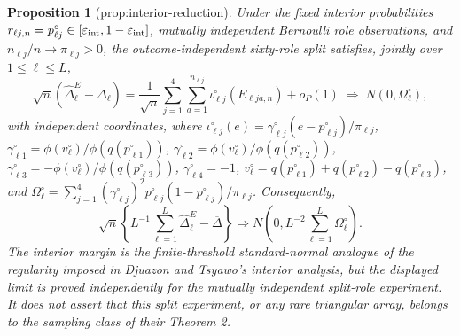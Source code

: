 \documentclass{article}
\newtheorem{proposition}{Proposition}
\begin{document}
\begin{proposition}[prop:interior-reduction]\label{prop:interior-reduction}
Under the fixed interior probabilities \(r_{\ell j,n}=p^{\circ}_{\ell j}\in[\varepsilon_{\rm int},1-\varepsilon_{\rm int}]\), mutually independent Bernoulli role observations, and \(n_{\ell j}/n\to\pi_{\ell j}>0\), the outcome-independent sixty-role split satisfies, jointly over \(1\le\ell\le L\),
\[
\sqrt n(\widehat\Delta^E_{\ell}-\Delta_{\ell})
=\frac1{\sqrt n}\sum_{j=1}^{4}\sum_{a=1}^{n_{\ell j}}
\iota^{\circ}_{\ell j}(E_{\ell j a,n})+o_{P}(1)
\;\Rightarrow\;N(0,\Omega^{\circ}_{\ell}),
\]
with independent coordinates, where \(\iota^{\circ}_{\ell j}(e)=\gamma^{\circ}_{\ell j}(e-p^{\circ}_{\ell j})/\pi_{\ell j}\), \(\gamma^{\circ}_{\ell1}=\phi(v^{\circ}_{\ell})/\phi(q(p^{\circ}_{\ell1}))\), \(\gamma^{\circ}_{\ell2}=\phi(v^{\circ}_{\ell})/\phi(q(p^{\circ}_{\ell2}))\), \(\gamma^{\circ}_{\ell3}=-\phi(v^{\circ}_{\ell})/\phi(q(p^{\circ}_{\ell3}))\), \(\gamma^{\circ}_{\ell4}=-1\), \(v^{\circ}_{\ell}=q(p^{\circ}_{\ell1})+q(p^{\circ}_{\ell2})-q(p^{\circ}_{\ell3})\), and \(\Omega^{\circ}_{\ell}=\sum_{j=1}^{4}(\gamma^{\circ}_{\ell j})^2p^{\circ}_{\ell j}(1-p^{\circ}_{\ell j})/\pi_{\ell j}\). Consequently,
\[
\sqrt n\left\{L^{-1}\sum_{\ell=1}^{L}\widehat\Delta^E_{\ell}-\overline\Delta\right\}
\Rightarrow N\!\left(0,L^{-2}\sum_{\ell=1}^{L}\Omega^{\circ}_{\ell}\right).
\]
The interior margin is the finite-threshold standard-normal analogue of the regularity imposed in Djuazon and Tsyawo's interior analysis, but the displayed limit is proved independently for the mutually independent split-role experiment. It does not assert that this split experiment, or any rare triangular array, belongs to the sampling class of their Theorem 2.
\end{proposition}
\end{document}
